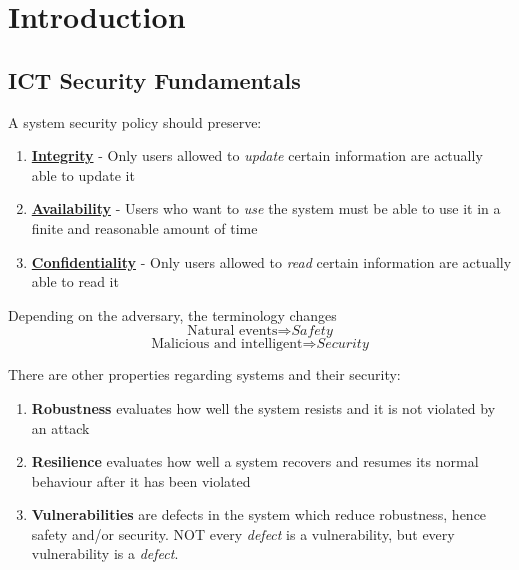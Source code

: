 \chapter{Introduction}



\section{ICT Security Fundamentals}
A system security policy should preserve:
\begin{enumerate}
    \item \textbf{\ul{Integrity}} - Only users allowed to \textit{update} certain information are actually able to update it
    \item \textbf{\ul{Availability}} - Users who want to \textit{use} the system must be able to use it in a finite and reasonable amount of time
    \item \textbf{\ul{Confidentiality}} - Only users allowed to \textit{read} certain information are actually able to read it
\end{enumerate}

Depending on the adversary, the terminology changes
\[\text{Natural events} \Rightarrow \textit{Safety}\]
\[\text{Malicious and intelligent} \Rightarrow \textit{Security}\]

There are other properties regarding systems and their security:
\begin{enumerate}
    \item \textbf{Robustness} evaluates how well the system resists and it is not violated by an attack
    \item \textbf{Resilience} evaluates how well a system recovers and resumes its normal behaviour after it has been violated
    \item \textbf{Vulnerabilities} are defects in the system which reduce robustness, hence safety and/or security. \nl
    NOT every \textit{defect} is a vulnerability,
    but every vulnerability is a \textit{defect}.
\end{enumerate}


